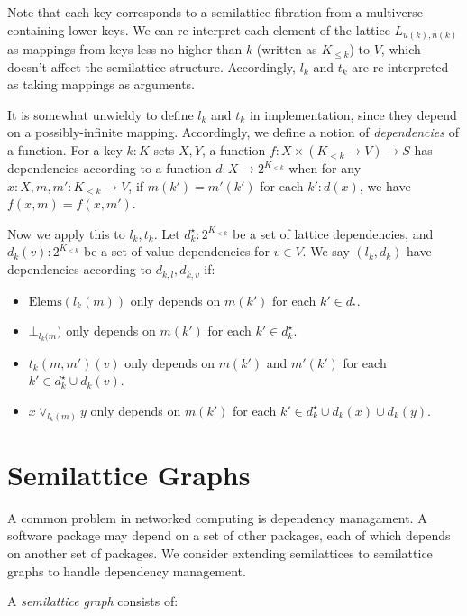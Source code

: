 \documentclass{article}
\begin{document}
      Note that each key corresponds to a semilattice fibration from a multiverse containing lower keys. We can re-interpret each element of the lattice $L_{u(k), n(k)}$ as mappings from keys less no higher than $k$ (written as $K_{\leq k}$) to $V$, which doesn't affect the semilattice structure. Accordingly, $l_k$ and $t_k$ are re-interpreted as taking mappings as arguments.

      It is somewhat unwieldy to define $l_k$ and $t_k$ in implementation, since they depend on a possibly-infinite mapping. Accordingly, we define a notion of \emph{dependencies} of a function. For a key $k : K$ sets $X, Y$, a function $f : X \times (K_{<k} \rightarrow V) \rightarrow S$ has dependencies according to a function $d : X \rightarrow 2^{K_{<k}}$ when for any $x : X, m, m' : K_{<k} \rightarrow V$, if $m(k') = m'(k')$ for each $k' : d(x)$, we have $f(x, m) = f(x, m')$.

      Now we apply this to $l_k, t_k$. Let $d_k^\star : 2^{K_{<k}}$ be a set of lattice dependencies, and $d_{k}(v) : 2^{K_{<k}}$ be a set of value dependencies for $v \in V$. We say $(l_k, d_k)$ have dependencies according to $d_{k, l}, d_{k, v}$ if:

      \begin{itemize}
        \item $\mathrm{Elems}(l_k(m))$ only depends on $m(k')$ for each $k' \in d_^\star$.
        \item $\bot_{l_k(m})$ only depends on $m(k')$ for each $k' \in d_k^\star$.
        \item $t_k(m, m')(v)$ only depends on $m(k')$ and $m'(k')$ for each $k' \in d_k^\star \cup d_k(v)$.
        \item $x \vee_{l_k(m)} y$ only depends on $m(k')$ for each $k' \in d_k^\star \cup d_k(x) \cup d_k(y)$.
      \end{itemize}

    \section{Semilattice Graphs}

        A common problem in networked computing is dependency managament. A software package may depend on a set of other packages, each of which depends on another set of packages. We consider extending semilattices to semilattice graphs to handle dependency management.
        
        A \emph{semilattice graph} consists of:
\end{document}
